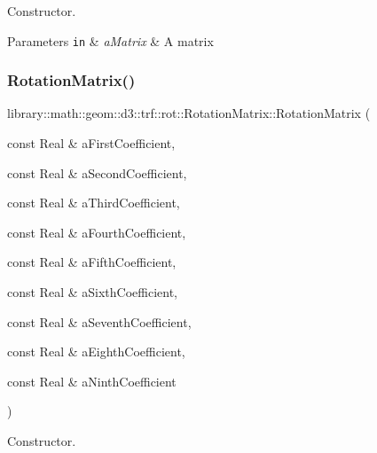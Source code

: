 Constructor. 


\begin{DoxyParams}[1]{Parameters}
\mbox{\tt in}  & {\em a\+Matrix} & A matrix \\
\hline
\end{DoxyParams}
\mbox{\label{classlibrary_1_1math_1_1geom_1_1d3_1_1trf_1_1rot_1_1_rotation_matrix_a7618d97ef4861054a071a3431176c3a1}} 
\subsubsection{\texorpdfstring{Rotation\+Matrix()}{RotationMatrix()}\hspace{0.1cm}{\footnotesize\ttfamily [2/2]}}
{\footnotesize\ttfamily library\+::math\+::geom\+::d3\+::trf\+::rot\+::\+Rotation\+Matrix\+::\+Rotation\+Matrix (\begin{DoxyParamCaption}\item[{const Real \&}]{a\+First\+Coefficient,  }\item[{const Real \&}]{a\+Second\+Coefficient,  }\item[{const Real \&}]{a\+Third\+Coefficient,  }\item[{const Real \&}]{a\+Fourth\+Coefficient,  }\item[{const Real \&}]{a\+Fifth\+Coefficient,  }\item[{const Real \&}]{a\+Sixth\+Coefficient,  }\item[{const Real \&}]{a\+Seventh\+Coefficient,  }\item[{const Real \&}]{a\+Eighth\+Coefficient,  }\item[{const Real \&}]{a\+Ninth\+Coefficient }\end{DoxyParamCaption})}



Constructor. 


